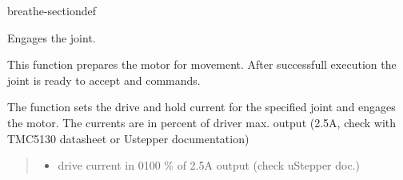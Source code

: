 \documentclass[letterpaper,10pt,english]{sphinxmanual}
\begin{document}
\begin{fulllineitems}
\begin{sphinxuseclass}{breathe-sectiondef}
\begin{fulllineitems}
\label{\detokenize{code/bioscara_hardware_drivers/index:_CPPv4N25bioscara_hardware_drivers25bioscara_hardware_drivers5Joint6enableE8u_int8_t8u_int8_t}}\label{\detokenize{code/bioscara_hardware_drivers/index:_CPPv3N25bioscara_hardware_drivers25bioscara_hardware_drivers5Joint6enableE8u_int8_t8u_int8_t}}\label{\detokenize{code/bioscara_hardware_drivers/index:_CPPv2N25bioscara_hardware_drivers25bioscara_hardware_drivers5Joint6enableE8u_int8_t8u_int8_t}}\label{\detokenize{code/bioscara_hardware_drivers/index:bioscara_hardware_drivers::bioscara_hardware_drivers::Joint::enable__u_int8_t.u_int8_t}}
\pysigstartsignatures
\pysigstartmultiline
\pysiglinewithargsret
{\label{\detokenize{code/bioscara_hardware_drivers/index:classbioscara__hardware__drivers_1_1Joint_1a4fba72ada8234cb624658560a3c40530}}}
{\sphinxparamcomma {}}
{}
\pysigstopmultiline
\pysigstopsignatures
\sphinxAtStartPar
Engages the joint. 

\sphinxAtStartPar
This function prepares the motor for movement. After successfull execution the joint is ready to accept {\hyperref[\detokenize{code/bioscara_hardware_drivers/index:classbioscara__hardware__drivers_1_1Joint_1a8d477e842ea6139ca17fde0af43bc482}]{}} and {\hyperref[\detokenize{code/bioscara_hardware_drivers/index:classbioscara__hardware__drivers_1_1Joint_1a5b2479210b861c53c3c4e53cf12d75be}]{}} commands.

\sphinxAtStartPar
The function sets the drive and hold current for the specified joint and engages the motor. The currents are in percent of driver max. output (2.5A, check with TMC5130 datasheet or Ustepper documentation) 
\begin{quote}\begin{description}
\begin{itemize}
\item {} 
\sphinxAtStartPar
{} \textendash{} drive current in 0\sphinxhyphen{}100 \% of 2.5A output (check uStepper doc.) 


\end{itemize}
\end{description}
\end{quote}
\end{fulllineitems}
\end{sphinxuseclass}
\end{fulllineitems}
\end{document}
